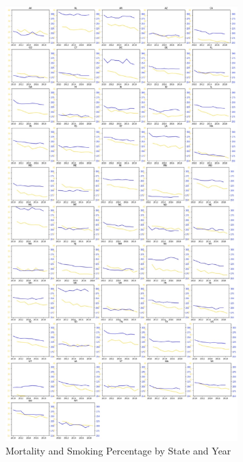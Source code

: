\documentclass{article}
\begin{document}
\begin{figure}
\centering
\caption{\label{fig:figureset}Mortality and Smoking Percentage by State and Year}
\includegraphics[width=0.8\textwidth]{set_graph1.jpg}
\end{figure}
\end{document}
